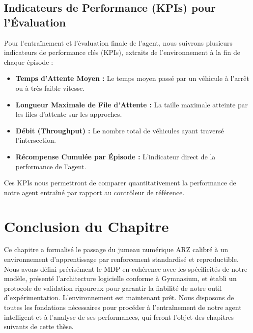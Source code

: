\subsection{Indicateurs de Performance (KPIs) pour l'Évaluation}
\label{subsec:kpi_evaluation}
Pour l'entraînement et l'évaluation finale de l'agent, nous suivrons plusieurs indicateurs de performance clés (KPIs), extraits de l'environnement à la fin de chaque épisode :
\begin{itemize}
    \item \textbf{Temps d'Attente Moyen :} Le temps moyen passé par un véhicule à l'arrêt ou à très faible vitesse.
    \item \textbf{Longueur Maximale de File d'Attente :} La taille maximale atteinte par les files d'attente sur les approches.
    \item \textbf{Débit (Throughput) :} Le nombre total de véhicules ayant traversé l'intersection.
    \item \textbf{Récompense Cumulée par Épisode :} L'indicateur direct de la performance de l'agent.
\end{itemize}
Ces KPIs nous permettront de comparer quantitativement la performance de notre agent entraîné par rapport au contrôleur de référence.

\section{Conclusion du Chapitre}
\label{sec:conclusion_conception_rl}

Ce chapitre a formalisé le passage du jumeau numérique ARZ calibré à un environnement d'apprentissage par renforcement standardisé et reproductible. Nous avons défini précisément le MDP en cohérence avec les spécificités de notre modèle, présenté l'architecture logicielle conforme à Gymnasium, et établi un protocole de validation rigoureux pour garantir la fiabilité de notre outil d'expérimentation. L'environnement est maintenant prêt. Nous disposons de toutes les fondations nécessaires pour procéder à l'entraînement de notre agent intelligent et à l'analyse de ses performances, qui feront l'objet des chapitres suivants de cette thèse.